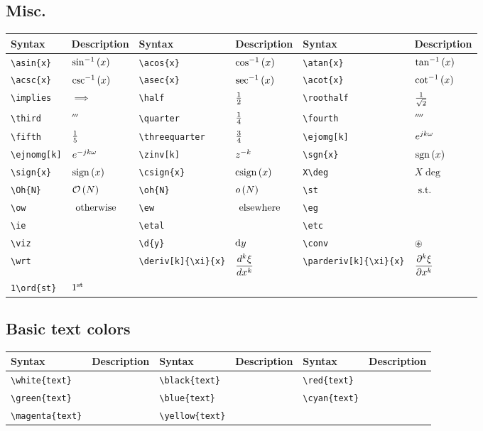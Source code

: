 \documentclass{article}
\begin{document}
	\subsection{Misc.}
	\begin{table}[H]
		\setlength\extrarowheight{6pt}
		\begin{tabular}{|l|l|l|l|l|l|}
			\hline
			Syntax	&	Description	&	Syntax	&	Description	&	Syntax	&	Description	 \\
			\hline
			\verb|\asin{x}|	&	$\asin{x}$	&	\verb|\acos{x}|	&	$\acos{x}$	&	\verb|\atan{x}|	&	$\atan{x}$ \\	
			\verb|\acsc{x}|	&	$\acsc{x}$	&	\verb|\asec{x}|	&	$\asec{x}$	&	\verb|\acot{x}|	&	$\acot{x}$ \\
			\verb|\implies|	&	$\implies$	&	\verb|\half|	&	$\half$	&	\verb|\roothalf|	&	$\roothalf$ \\
			\verb|\third|	&	$\third$	&	\verb|\quarter|	&	$\quarter$	&	\verb|\fourth|	&	$\fourth$ \\
			\verb|\fifth|	&	$\fifth$	&	\verb|\threequarter|	&	$\threequarter$	&	\verb|\ejomg[k]|	&	$\ejomg[k]$ \\
			\verb|\ejnomg[k]|	&	$\ejnomg[k]$	&	\verb|\zinv[k]|	&	$\zinv[k]$	&	\verb|\sgn{x}|	&	$\sgn{x}$ \\
			\verb|\sign{x}|	&	$\sign{x}$	&	\verb|\csign{x}|	&	$\csign{x}$ & \verb|X\deg|	&	$X\deg$	\\			
			\verb|\Oh{N}|	&	$\Oh{N}$	&	\verb|\oh{N}|	&	$\oh{N}$	&	\verb|\st|	&	$\st$ \\
			\verb|\ow|	&	$\ow$	&	\verb|\ew|	&	$\ew$	&	\verb|\eg|	&	\eg \\
			\verb|\ie|	&	\ie	&	\verb|\etal|	&	\etal	&	\verb|\etc|	&	\etc \\
			\verb|\viz|	&	\viz & \verb|\d{y}|	&	$\d{y}$	&	\verb|\conv|	&	$\conv$	\\
			\verb|\wrt|	&	\wrt & \verb|\deriv[k]{\xi}{x}|	&	$\deriv[k]{\xi}{x}$	&	\verb|\parderiv[k]{\xi}{x}|	&	$\parderiv[k]{\xi}{x}$	\\
			\verb|1\ord{st}|	&	$1\ord{st}$ & 	&		&		&		\\	
			\hline	
		\end{tabular}
	\end{table}

	\subsection{Basic text colors}
	\begin{table}[H]
		\begin{tabular}{|l|l|l|l|l|l|}
			\hline
			Syntax	&	Description	&	Syntax	&	Description	&	Syntax	&	Description	 \\
			\hline
			\verb|\white{text}|	&	\white{text}	&	\verb|\black{text}|	&	\black{text}	&	\verb|\red{text}|	&	\red{text} \\	
			\verb|\green{text}|	&	\green{text}	&	\verb|\blue{text}|	&	\blue{text}	&	\verb|\cyan{text}|	&	\cyan{text} \\
			\verb|\magenta{text}|	&	\magenta{text}	&	\verb|\yellow{text}|	&	\yellow{text}	&		&	 \\
			\hline	
		\end{tabular}
	\end{table}
\end{document}
